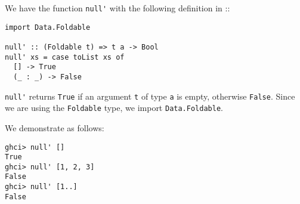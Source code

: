 
We have the function \verb|null'| with the following definition in 
::
\begin{verbatim}
import Data.Foldable

null' :: (Foldable t) => t a -> Bool
null' xs = case toList xs of
  [] -> True
  (_ : _) -> False
\end{verbatim}
\verb|null'| returns \verb|True| if an argument \verb|t| of type \verb|a| 
is empty, otherwise \verb|False|. Since we are using the \verb|Foldable| 
type, we import \verb|Data.Foldable|.\par
\qquad We demonstrate as follows:
\begin{verbatim}
ghci> null' []
True
ghci> null' [1, 2, 3]
False
ghci> null' [1..]
False
\end{verbatim}
